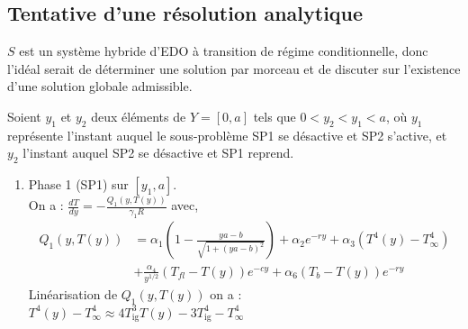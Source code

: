 \documentclass[12pt, oneside]{report} %
\theoremstyle{definition}
\theoremstyle{remark}
\begin{document}
\subsection{Tentative d'une résolution analytique}
$S$ est un système hybride d'EDO à transition de régime conditionnelle, donc l'idéal serait de déterminer une solution par morceau et de discuter sur l'existence d'une solution globale admissible.  

Soient $y_1$ et $y_2$ deux éléments de $Y = \left[0, a\right]$ tels que $0 < y_2 < y_1 < a$,  
où $y_1$ représente l’instant auquel le sous-problème SP1 se désactive et SP2 s’active,  
et $y_2$ l’instant auquel SP2 se désactive et SP1 reprend.


\begin{enumerate}
	\item Phase 1 (SP1) sur $\left[y_1, a \right]$.\\
	On a : $  \frac{dT}{dy} = -\frac{Q_1(y, T(y))}{\gamma_1 R}$ \quad avec, 
	\begin{align*}
		 Q_1(y, T(y)) &= \alpha_1 \left(1-\frac{ya-b}{\sqrt{1+(ya-b)^2}}\right) + \alpha_2e^{-ry}+ \alpha_3\left(T^4(y) - T_\infty^4\right)\\
		& + \frac{\alpha_4}{y^{1/2}}(T_{fl} - T(y))e^{-cy} + \alpha_6(T_b-T(y))e^{-ry}
	\end{align*}
	Linéarisation de $Q_1(y, T(y))$ on a : $T^4(y) - T_\infty^4 \approx 4T_{\text{ig}}^3 T(y) - 3T_{\text{ig}}^4 - T_\infty^4$


\end{enumerate}
\end{document}
